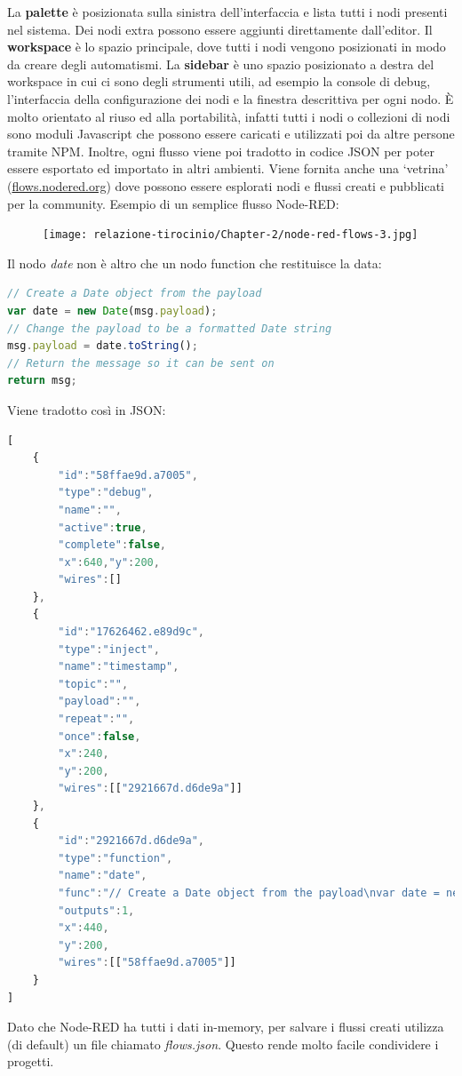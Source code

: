 \documentclass[a4paper,10pt]{memoir}
\begin{document}
La \textbf{palette} è posizionata sulla sinistra dell'interfaccia e lista tutti i nodi presenti nel sistema. Dei nodi extra possono essere aggiunti direttamente dall'editor.
Il \textbf{workspace} è lo spazio principale, dove tutti i nodi vengono posizionati in modo da creare degli automatismi.
La \textbf{sidebar} è uno spazio posizionato a destra del workspace in cui ci sono degli strumenti utili, ad esempio la console di debug, l'interfaccia della configurazione dei nodi e la finestra descrittiva per ogni nodo.
È molto orientato al riuso ed alla portabilità, infatti tutti i nodi o collezioni di nodi sono moduli Javascript che possono essere caricati e utilizzati poi da altre persone tramite NPM.
Inoltre, ogni flusso viene poi tradotto in codice JSON per poter essere esportato ed importato in altri ambienti.
Viene fornita anche una `vetrina' (\href{https://flows.nodered.org}{flows.nodered.org}) dove possono essere esplorati nodi e flussi creati e pubblicati per la community.
Esempio di un semplice flusso Node-RED:
\begin{figure}[H]
\texttt{[image: relazione-tirocinio/Chapter-2/node-red-flows-3.jpg]}
\end{figure}
Il nodo \textit{date} non è altro che un nodo function che restituisce la data:
\begin{lstlisting}[language=JavaScript]
// Create a Date object from the payload
var date = new Date(msg.payload);
// Change the payload to be a formatted Date string
msg.payload = date.toString();
// Return the message so it can be sent on
return msg;
\end{lstlisting}
Viene tradotto così in JSON:
\begin{lstlisting}[language=JavaScript]
[
    {
        "id":"58ffae9d.a7005",
        "type":"debug",
        "name":"",
        "active":true,
        "complete":false,
        "x":640,"y":200,
        "wires":[]
    },
    {
        "id":"17626462.e89d9c",
        "type":"inject",
        "name":"timestamp",
        "topic":"",
        "payload":"",
        "repeat":"",
        "once":false,
        "x":240,
        "y":200,
        "wires":[["2921667d.d6de9a"]]
    },
    {
        "id":"2921667d.d6de9a",
        "type":"function",
        "name":"date",
        "func":"// Create a Date object from the payload\nvar date = new Date(msg.payload);\n// Change the payload to be a formatted Date string\nmsg.payload = date.toString();\n// Return the message so it can be sent on\nreturn msg;",
        "outputs":1,
        "x":440,
        "y":200,
        "wires":[["58ffae9d.a7005"]]
    }
]
\end{lstlisting}
Dato che Node-RED ha tutti i dati in-memory, per salvare i flussi creati utilizza (di default) un file chiamato \textit{flows.json}. Questo rende molto facile condividere i progetti.
\end{document}
